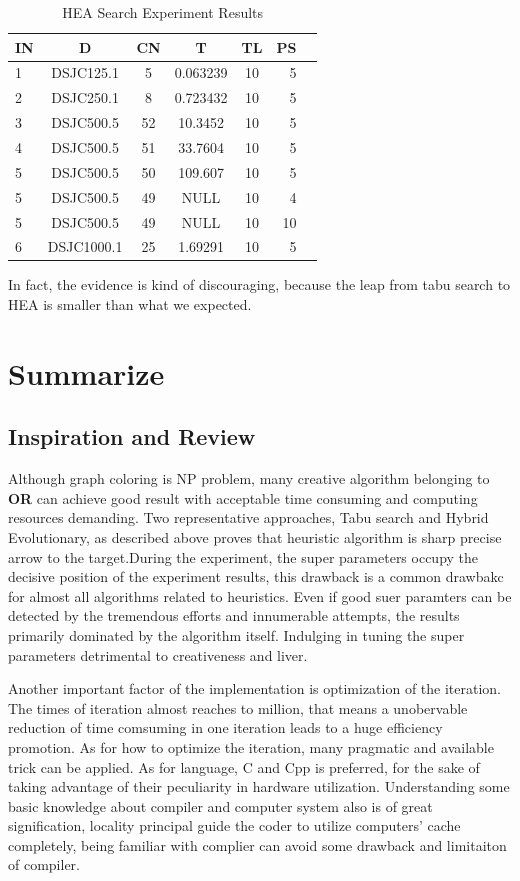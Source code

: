 \documentclass[10pt, a4paper, twocolumn]{article} %
\begin{document}
\begin{table}
	\caption{HEA Search Experiment Results}
	\centering
    \label{HEA:res}
    \begin{tabular}{l*{4}{c}r | p{1cm}}
        IN & D & CN & T & TL & PS  \\
    \hline
    1 & DSJC125.1 &5 &  0.063239  & 10 & 5    \\
    2 & DSJC250.1 &8 &   0.723432 & 10 & 5    \\
    3 & DSJC500.5 &52 &  10.3452  & 10 & 5    \\
    4 & DSJC500.5 &51 &  33.7604  & 10 & 5    \\
    5 & DSJC500.5 &50 & 109.607  & 10 & 5    \\
    5 & DSJC500.5 &49 & NULL  & 10 & 4    \\
    5 & DSJC500.5 &49 & NULL  & 10 & 10    \\
    6 & DSJC1000.1 &25 & 1.69291  & 10 & 5    \\
    \end{tabular}
\end{table}

In fact, the evidence is kind of discouraging, because the leap from tabu search
to HEA is smaller than what we expected.


\section{Summarize}

\subsection{Inspiration and Review}
Although graph coloring is NP problem, many creative algorithm belonging to
\textbf{OR} can achieve good result with acceptable time consuming and computing
resources demanding. Two representative approaches, Tabu search and Hybrid
Evolutionary, as described above proves that heuristic algorithm is sharp
precise arrow to the target.During the experiment, the super parameters occupy
the decisive position of the experiment results, this drawback is a common
drawbakc for almost all algorithms related to heuristics. Even if good suer
paramters can be detected by the tremendous efforts and innumerable attempts,
the results primarily dominated by the algorithm itself. Indulging in tuning the
super parameters detrimental to creativeness and liver.

Another important factor of the implementation is optimization of the iteration.
The times of iteration almost reaches to million, that means a unobervable
reduction of time comsuming in one iteration leads to a huge efficiency
promotion. As for how to optimize the iteration, many pragmatic and available
trick can be applied. As for language, C and Cpp is preferred, for the sake of
taking advantage of their peculiarity in hardware utilization.  Understanding
some basic knowledge about compiler and computer system also is of great
signification, locality principal guide the coder to utilize computers' cache
completely, being familiar with complier can avoid some drawback and limitaiton
of compiler.
\end{document}
